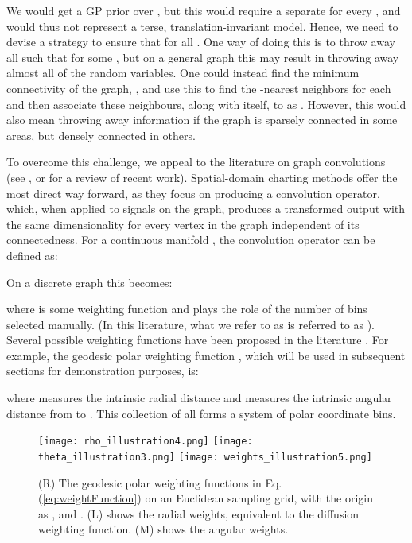 \documentclass{article}
\begin{document}
We would get a GP prior over , but this would require a separate  for every , and would thus not represent a terse, translation-invariant model. Hence, we need to devise a strategy to ensure that  for all . One way of doing this is to throw away all  such that  for some , but on a general graph this may result in throwing away almost all of the random variables. One could instead find the minimum connectivity of the graph, , and use this to find the -nearest neighbors for each  and then associate these neighbours, along with  itself, to  as . However, this would also mean throwing away information if the graph is sparsely connected in some areas, but densely connected in others.

To overcome this challenge, we appeal to the literature on graph convolutions (see \citet{niepert2016learning}, \citet{kipf2016semi} or \citet{gdl} for a review of recent work). Spatial-domain charting methods offer the most direct way forward, as they focus on producing a convolution operator, which, when applied to signals on the graph, produces a transformed output with the same dimensionality for every vertex in the graph independent of its connectedness. For a continuous manifold , the convolution operator can be defined as:

On a discrete graph this becomes:

where  is some weighting function and  plays the role of the number of bins selected manually. (In this literature, what we refer to as  is referred to as ). Several possible weighting functions  have been proposed in the literature \citep{gdl}. For example, the geodesic polar weighting function \citep{graphNN}, which will be used in subsequent sections for demonstration purposes, is:

where  measures the intrinsic radial distance and  measures the intrinsic angular distance from  to . This collection of all  forms a system of polar coordinate bins.

\begin{figure}
\centering
\texttt{[image: rho\_illustration4.png]}
\texttt{[image: theta\_illustration3.png]}
\texttt{[image: weights\_illustration5.png]}
\caption{(R) The geodesic polar weighting functions in Eq. (\ref{eq:weightFunction}) on an Euclidean sampling grid, with the origin as , and . (L) shows the radial weights, equivalent to the diffusion weighting function. (M) shows the angular weights. }\label{fig:weights}
\vspace{-.5cm}
\end{figure}
\end{document}
